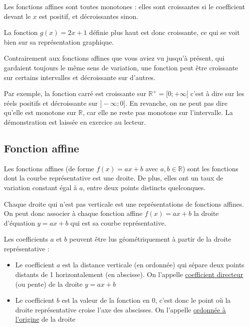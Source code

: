 \documentclass[10pt,a4paper]{book}
\newcommand{\R}{\mathbb{R}}
\begin{document}
\begin{prop}
    Les fonctions affines sont toutes monotones : elles sont croissantes si le coefficient devant le $x$ est positif, et décroissantes sinon.
\end{prop}

La fonction $g(x)=2x+1$ définie plus haut est donc croissante, ce qui se voit bien sur sa représentation graphique.

Contrairement aux fonctions affines que vous aviez vu jusqu'à présent, qui gardaient toujours le même sens de variation, une fonction peut être croissante sur certains intervalles et décroissante sur d'autres. 

Par exemple, la fonction carré est croissante sur $\R^+=[0;+\infty[$ c'est à dire sur les réels positifs et décroissante sur $]-\infty;0]$.  En revanche, on ne peut pas dire qu'elle est monotone sur $\R$, car elle ne reste pas monotone sur l'intervalle. La démonstration est laissée en exercice au lecteur.

\subsection{Fonction affine}

\begin{prop}
    Les fonctions affines (de forme $f(x)=ax+b$ avec $a,b \in \R$) sont les fonctions dont la courbe représentative est une droite. De plus, elles ont un taux de variation constant égal à $a$, entre deux points distincts quelconques.
\end{prop}

Chaque droite qui n'est pas verticale est une représentations de fonctions affines. On peut donc associer à chaque fonction affine $f(x)=ax+b$ 
la droite d'équation $y=ax+b$ qui est sa courbe représentative.

Les coefficients $a$ et $b$ peuvent être lus géométriquement à partir de la droite représentative :
\begin{itemize}
    \item Le coefficient $a$ est la distance verticale (en ordonnée) qui sépare deux points distants de 1 horizontalement (en abscisse). On l'appelle \underline{coefficient directeur} (ou pente) de la droite $y=ax+b$
    \item Le coefficient $b$ est la valeur de la fonction en $0$, c'est donc le point où la droite représentative croise l'axe des abscisses. On l'appelle \underline{ordonnée à l'origine} de la droite
\end{itemize}
\end{document}
